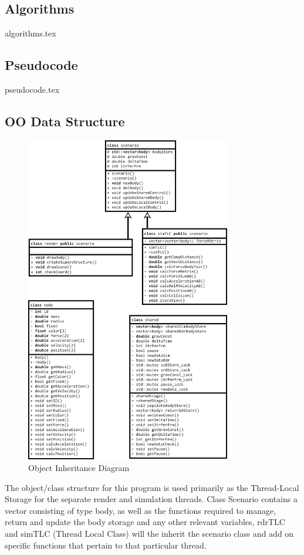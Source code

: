\pagebreak
\subsection{Algorithms}
{algorithms.tex}

\pagebreak
\subsection{Pseudocode}
{pseudocode.tex}

\pagebreak
\subsection{OO Data Structure}
\begin{figure}[!ht]
  \centering
  \includegraphics[width=0.8\textwidth]{img/did.png}
  \caption{Object Inheritance Diagram}
\end{figure}

The object/class structure for this program is used primarily as the Thread-Local Storage for the separate render and simulation threads. Class Scenario contains a vector consisting of type body, as well as the functions required to manage, return and update the body storage and any other relevant variables, rdrTLC and simTLC (Thread Local Class) will the inherit the scenario class and add on specific functions that pertain to that particular thread.

